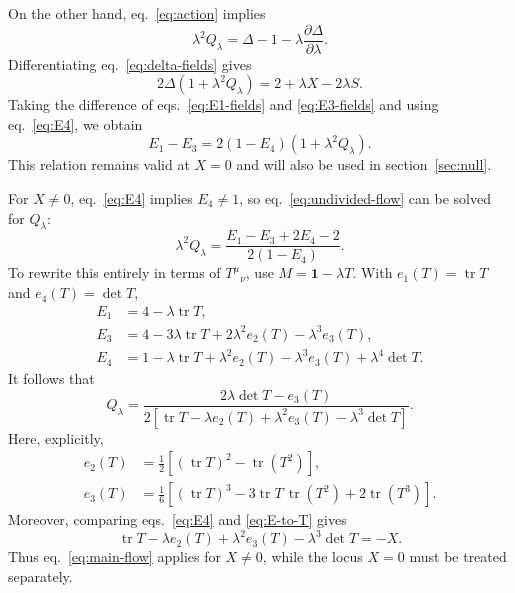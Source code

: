 \documentclass[a4paper,11pt]{article}
\numberwithin{equation}{section}
\newcommand{\tr}{\operatorname{tr}}
\newcommand{\Id}{\mathbf 1}
\begin{document}
On the other hand, eq.~\eqref{eq:action} implies
\begin{equation}
 \lambda^2Q_\lambda
 =\Delta-1-\lambda\frac{\partial\Delta}{\partial\lambda}.
 \label{eq:Q-delta}
\end{equation}
Differentiating eq.~\eqref{eq:delta-fields} gives
\begin{equation}
 2\Delta\left(1+\lambda^2Q_\lambda\right)
 =2+\lambda X-2\lambda S.
 \label{eq:Q-field-relation}
\end{equation}
Taking the difference of eqs.~\eqref{eq:E1-fields} and \eqref{eq:E3-fields} and using eq.~\eqref{eq:E4}, we obtain
\begin{equation}
 E_1-E_3
 =2(1-E_4)\left(1+\lambda^2Q_\lambda\right).
 \label{eq:undivided-flow}
\end{equation}
This relation remains valid at $X=0$ and will also be used in section~\ref{sec:null}.

For $X\neq0$, eq.~\eqref{eq:E4} implies $E_4\neq1$, so eq.~\eqref{eq:undivided-flow} can be solved for $Q_\lambda$:
\begin{equation}
 \lambda^2Q_\lambda
 =\frac{E_1-E_3+2E_4-2}{2(1-E_4)}.
 \label{eq:flow-E}
\end{equation}
To rewrite this entirely in terms of $T^\mu{}_{\nu}$, use $M=\Id-\lambda T$. With $e_1(T)=\tr T$ and $e_4(T)=\det T$,
\begin{align}
 E_1&=4-\lambda\tr T,\nonumber\\
 E_3&=4-3\lambda\tr T+2\lambda^2e_2(T)-\lambda^3e_3(T),\nonumber\\
 E_4&=1-\lambda\tr T+\lambda^2e_2(T)-\lambda^3e_3(T)+\lambda^4\det T.
 \label{eq:E-to-T}
\end{align}
It follows that
\begin{equation}
 Q_\lambda
 =\frac{2\lambda\det T-e_3(T)}
 {2\left[\tr T-\lambda e_2(T)+\lambda^2e_3(T)-\lambda^3\det T\right]}.
 \label{eq:main-flow}
\end{equation}
Here, explicitly,
\begin{align}
 e_2(T)&=\frac12\left[(\tr T)^2-\tr(T^2)\right],\nonumber\\
 e_3(T)&=\frac16\left[(\tr T)^3-3\tr T\,\tr(T^2)+2\tr(T^3)\right].
 \label{eq:e2e3-explicit}
\end{align}
Moreover, comparing eqs.~\eqref{eq:E4} and \eqref{eq:E-to-T} gives
\begin{equation}
 \tr T-\lambda e_2(T)+\lambda^2e_3(T)-\lambda^3\det T=-X.
 \label{eq:denominator-X}
\end{equation}
Thus eq.~\eqref{eq:main-flow} applies for $X\neq0$, while the locus $X=0$ must be treated separately.
\end{document}

